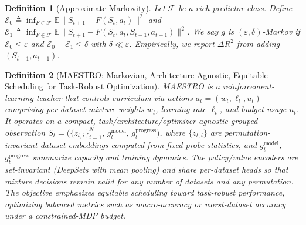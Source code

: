 \documentclass[11pt]{article}
\newtheorem{definition}{Definition}
\newcommand{\E}{\mathbb{E}}
\newcommand{\1}{\mathbf{1}}
\newcommand{\MAESTRO}{\textsc{MAESTRO}\xspace}
\begin{document}
\begin{definition}[Approximate Markovity]
\label{def:approx-markov-tight}
Let $\mathcal{F}$ be a rich predictor class. Define
$\mathcal{E}_0 \triangleq \inf_{F\in\mathcal{F}} \E\| S_{t+1} - F(S_t,a_t)\|^2$
and
$\mathcal{E}_1 \triangleq \inf_{F\in\mathcal{F}} \E\| S_{t+1} - F(S_t,a_t,S_{t-1},a_{t-1})\|^2$.
We say $g$ is $(\varepsilon,\delta)$-Markov if $\mathcal{E}_0 \le \varepsilon$ and
$\mathcal{E}_0 - \mathcal{E}_1 \le \delta$ with $\delta \ll \varepsilon$.
Empirically, we report $\Delta R^2$ from adding $(S_{t-1},a_{t-1})$.
\end{definition}

\begin{definition}[\MAESTRO: Markovian, Architecture-Agnostic, Equitable Scheduling for Task-Robust Optimization]\label{def:maestro}
\MAESTRO{} is a reinforcement-learning teacher that controls curriculum via actions
$a_t=(w_t,\ell_t,u_t)$ comprising per-dataset mixture weights $w_t$, learning rate $\ell_t$, and budget usage $u_t$.
It operates on a compact, task/architecture/optimizer-agnostic \emph{grouped} observation
$S_t=\big(\{z_{t,i}\}_{i=1}^N,\,g^{\mathrm{model}}_t,\,g^{\mathrm{progress}}_t\big)$,
where $\{z_{t,i}\}$ are permutation-invariant dataset embeddings computed from fixed probe statistics, and $g^{\mathrm{model}}_t$, $g^{\mathrm{progress}}_t$ summarize capacity and training dynamics.
The policy/value encoders are set-invariant (DeepSets with mean pooling) and share per-dataset heads so that mixture decisions remain valid for any number of datasets and any permutation.
The objective emphasizes \emph{equitable scheduling} toward task-robust performance, optimizing balanced metrics such as macro-accuracy or worst-dataset accuracy under a constrained-MDP budget.
\end{definition}
\end{document}
